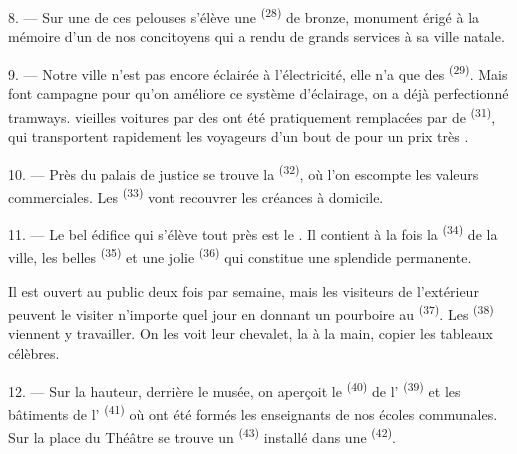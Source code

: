 8. --- Sur une de ces pelouses s'élève une  \textsuperscript{(28)}
de bronze, monument érigé à la mémoire d'un de nos concitoyens qui a rendu de
grands services à sa ville natale.

\VUsaut{4.0mm}
\VUsaut{3.4mm}

9. --- Notre ville n'est pas encore éclairée à l'électricité, elle n'a que des
 \textsuperscript{(29)}. Mais  font
campagne pour qu'on améliore ce système d'éclairage,  on a déjà
perfectionné  tramways.  vieilles
voitures  par des  ont été pratiquement
remplacées par de 
\textsuperscript{(31)}, qui transportent rapidement les voyageurs d'un bout de
 pour un prix très .

10. --- Près du palais de justice se trouve la 
\textsuperscript{(32)}, où l'on escompte les valeurs commerciales. Les
 \textsuperscript{(33)} vont recouvrer les créances à
domicile.

\VUsaut{4.0mm}
\VUsaut{3.4mm}

11. --- Le bel édifice qui s'élève tout près est le . Il contient
à la fois la  \textsuperscript{(34)} de la ville, les
belles  \textsuperscript{(35)} et une
jolie  \textsuperscript{(36)} qui constitue une
splendide  permanente.

Il est ouvert au public deux fois par semaine, mais les visiteurs de l'extérieur
peuvent le visiter n'importe quel jour en donnant un pourboire au
 \textsuperscript{(37)}. Les 
\textsuperscript{(38)} viennent y travailler. On les voit  leur
chevalet, la  à la main, copier les tableaux célèbres.

12. --- Sur la hauteur, derrière le musée, on aperçoit le 
\textsuperscript{(40)} de l' \textsuperscript{(39)} et les
bâtiments de l' \textsuperscript{(41)} où ont été formés
les enseignants de nos écoles communales. Sur la place du Théâtre se trouve un
 \textsuperscript{(43)} installé dans une  \textsuperscript{(42)}.

